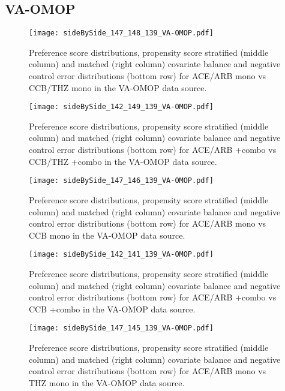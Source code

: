\documentclass[11pt,]{article}
\begin{document}
\clearpage

\hypertarget{va-omop-1}{%
\subsection{VA-OMOP}\label{va-omop-1}}

\begin{figure}
    \caption{Preference score distributions,
    propensity score stratified (middle column) and matched (right column) covariate balance
    and negative control error distributions (bottom row) for
    ACE/ARB mono vs CCB/THZ mono in the VA-OMOP data source.}
    \centerline{
        \texttt{[image: sideBySide\_147\_148\_139\_VA-OMOP.pdf]}
    }
\end{figure}
\begin{figure}
    \caption{Preference score distributions,
    propensity score stratified (middle column) and matched (right column) covariate balance
    and negative control error distributions (bottom row) for
    ACE/ARB +combo vs CCB/THZ +combo in the VA-OMOP data source.}
    \centerline{
        \texttt{[image: sideBySide\_142\_149\_139\_VA-OMOP.pdf]}
    }
\end{figure}
\begin{figure}
    \caption{Preference score distributions,
    propensity score stratified (middle column) and matched (right column) covariate balance
    and negative control error distributions (bottom row) for
    ACE/ARB mono vs CCB mono in the VA-OMOP data source.}
    \centerline{
        \texttt{[image: sideBySide\_147\_146\_139\_VA-OMOP.pdf]}
    }
\end{figure}
\begin{figure}
    \caption{Preference score distributions,
    propensity score stratified (middle column) and matched (right column) covariate balance
    and negative control error distributions (bottom row) for
    ACE/ARB +combo vs CCB +combo in the VA-OMOP data source.}
    \centerline{
        \texttt{[image: sideBySide\_142\_141\_139\_VA-OMOP.pdf]}
    }
\end{figure}
\begin{figure}
    \caption{Preference score distributions,
    propensity score stratified (middle column) and matched (right column) covariate balance
    and negative control error distributions (bottom row) for
    ACE/ARB mono vs THZ mono in the VA-OMOP data source.}
    \centerline{
        \texttt{[image: sideBySide\_147\_145\_139\_VA-OMOP.pdf]}
    }
\end{figure}
\end{document}
